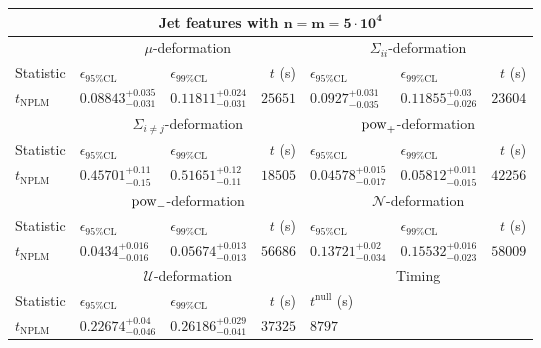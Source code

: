 \begin{tabular}{l|llr|llr}
	\toprule
	\multicolumn{7}{c}{{\bf Jet features with $\mathbf{n=m=5\cdot 10^{4}}$}} \\
	\toprule
	\multicolumn{1}{c}{} & \multicolumn{3}{c}{$\mu$-deformation} & \multicolumn{3}{c}{$\Sigma_{ii}$-deformation} \\
	Statistic & $\epsilon_{95\%\mathrm{CL}}$ & $\epsilon_{99\%\mathrm{CL}}$ & $t$ (s) & $\epsilon_{95\%\mathrm{CL}}$ & $\epsilon_{99\%\mathrm{CL}}$ & $t$ (s) \\
	\midrule
	$t_{\mathrm{NPLM}}$ & $0.08843_{-0.031}^{+0.035}$ & $0.11811_{-0.031}^{+0.024}$ & $25651$ & $0.0927_{-0.035}^{+0.031}$ & $0.11855_{-0.026}^{+0.03}$ & $23604$ \\
	\toprule
	\multicolumn{1}{c}{} & \multicolumn{3}{c}{$\Sigma_{i\neq j}$-deformation} & \multicolumn{3}{c}{$\rm{pow}_{+}$-deformation} \\
	Statistic & $\epsilon_{95\%\mathrm{CL}}$ & $\epsilon_{99\%\mathrm{CL}}$ & $t$ (s) & $\epsilon_{95\%\mathrm{CL}}$ & $\epsilon_{99\%\mathrm{CL}}$ & $t$ (s) \\
	\midrule
	$t_{\mathrm{NPLM}}$ & $0.45701_{-0.15}^{+0.11}$ & $0.51651_{-0.11}^{+0.12}$ & $18505$ & $0.04578_{-0.017}^{+0.015}$ & $0.05812_{-0.015}^{+0.011}$ & $42256$ \\
	\toprule
	\multicolumn{1}{c}{} & \multicolumn{3}{c}{$\rm{pow}_{-}$-deformation} & \multicolumn{3}{c}{$\mathcal{N}$-deformation} \\
	Statistic & $\epsilon_{95\%\mathrm{CL}}$ & $\epsilon_{99\%\mathrm{CL}}$ & $t$ (s) & $\epsilon_{95\%\mathrm{CL}}$ & $\epsilon_{99\%\mathrm{CL}}$ & $t$ (s) \\
	\midrule
	$t_{\mathrm{NPLM}}$ & $0.0434_{-0.016}^{+0.016}$ & $0.05674_{-0.013}^{+0.013}$ & $56686$ & $0.13721_{-0.034}^{+0.02}$ & $0.15532_{-0.023}^{+0.016}$ & $58009$ \\
	\toprule
	\multicolumn{1}{c}{} & \multicolumn{3}{c}{$\mathcal{U}$-deformation} & \multicolumn{3}{c}{Timing} \\
	Statistic & $\epsilon_{95\%\mathrm{CL}}$ & $\epsilon_{99\%\mathrm{CL}}$ & $t$ (s) & $t^{\mathrm{null}}$ (s) \\
	\midrule
	$t_{\mathrm{NPLM}}$ & $0.22674_{-0.046}^{+0.04}$ & $0.26186_{-0.041}^{+0.029}$ & $37325$ & $8797$ \\
	\bottomrule
\end{tabular}
